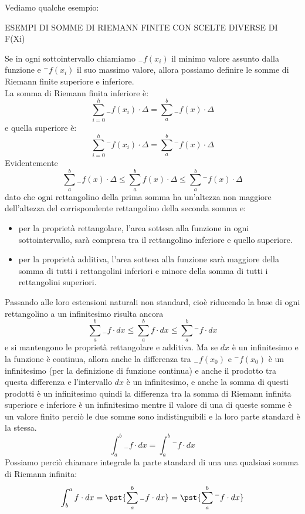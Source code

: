 Vediamo qualche esempio:

ESEMPI DI SOMME DI RIEMANN FINITE CON SCELTE DIVERSE DI F(Xi) %

Se in ogni sottointervallo chiamiamo \({}_{-}f(x_i)\) il minimo valore 
assunto dalla funzione e \({}^{-}f(x_i)\) il suo massimo valore, allora 
possiamo definire le somme di Riemann finite superiore e inferiore. \\
La somma di Riemann finita inferiore è: 
\[\sum_{i=0}^h{}_{-}f(x_i)\cdot\Delta = \sum_a^b{}_{-} f(x) \cdot \Delta\] 
e quella superiore è: 
\[\sum_{i=0}^h {}^{-}f(x_i)\cdot\Delta = \sum_a^b {}^{-}f(x) \cdot \Delta\]
Evidentemente 
\[\sum_a^b{}_{-}f(x) \cdot \Delta \le \sum_a^b f(x) \cdot \Delta \le 
\sum_a^b {}^{-}f(x) \cdot \Delta\] 
dato che ogni rettangolino della prima somma ha un'altezza non maggiore 
dell'altezza del corrispondente rettangolino della seconda somma e:

\begin{itemize} [nosep]
 \item per la proprietà rettangolare, l'area sottesa alla funzione in ogni 
sottointervallo, sarà compresa tra il rettangolino inferiore e quello 
superiore.
 \item per la proprietà additiva, l'area sottesa alla funzione sarà maggiore 
della somma di tutti i rettangolini inferiori e minore della somma di tutti i 
rettangolini superiori.
\end{itemize}

  Passando alle loro estensioni naturali non standard, cioè riducendo la base 
di ogni rettangolino a un infinitesimo risulta ancora 
\[\sum_a^b {}_{-}f \cdot dx \le \sum_a^b f \cdot dx \le 
  \sum_a^b {}^{-}f \cdot dx\] 
e si mantengono le proprietà rettangolare e additiva. 
Ma se \(dx\) è un infinitesimo e la funzione è continua, allora anche la 
differenza tra \({}_{-}f(x_0)\) e \({}^{-}f(x_0)\) è un infinitesimo (per la 
definizione di funzione continua) e anche il prodotto tra questa differenza e 
l'intervallo \(dx\) è un infinitesimo, e anche la somma di questi prodotti è 
un infinitesimo quindi la differenza tra la somma di Riemann infinita 
superiore e inferiore è un infinitesimo mentre il valore di una di queste 
somme è un valore finito perciò le due somme sono indistinguibili e la loro 
parte standard è la stessa.
\[\int_a^b {}_{-}f \cdot dx = \int_a^b {}^{-}f \cdot dx\]
Possiamo perciò chiamare integrale la parte standard di una una qualsiasi 
somma di Riemann infinita:
\[\int_b^a f \cdot dx = \pst{\sum_a^b {}_{-}f \cdot dx} =
                        \pst{\sum_a^b {}^{-}f \cdot dx}\]

